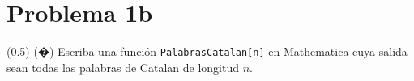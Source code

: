 \section*{Problema 1b}
(0.5) (�) Escriba una función \texttt{PalabrasCatalan[n]} en Mathematica cuya salida sean todas las palabras de Catalan de longitud $n$.
